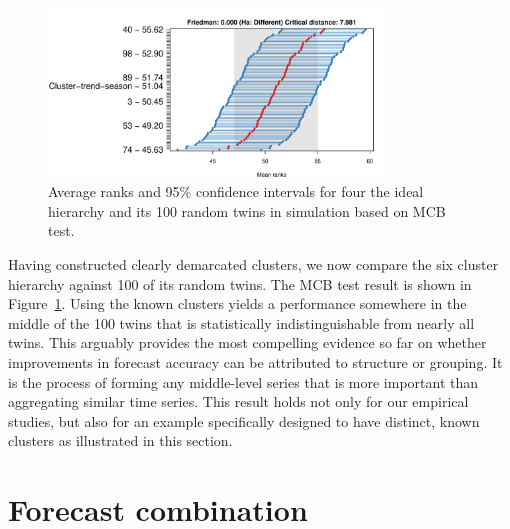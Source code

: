 \documentclass[a4paper,review,12pt,authoryear]{elsarticle}
\begin{document}
\begin{figure}[h!]
    \centering
\includegraphics[width=0.8\textwidth]{figures/hierarchy_rmsse/simulation/P3_c_vs_pc.pdf}
    \vspace{-0.1in}
    \caption{Average ranks and 95\% confidence intervals for four the ideal hierarchy and its 100 random twins in simulation based on MCB test.}
    \label{fig:simu_P3_c_vs_pc}
\end{figure}


Having constructed clearly demarcated clusters, we now compare the six cluster hierarchy against 100 of its random twins.  The MCB test result is shown in Figure~\ref{fig:simu_P3_c_vs_pc}. Using the known clusters yields a performance somewhere in the middle of the 100 twins that is statistically indistinguishable from nearly all twins. %
This arguably provides the most compelling evidence so far on whether improvements in forecast accuracy can be attributed to structure or grouping. It is the process of forming any middle-level series that is more important than aggregating similar time series. This result holds not only for our empirical studies, but also for an example specifically designed to have distinct, known clusters as illustrated in this section.






\section{Forecast combination}
\label{sec:combination}
\end{document}
